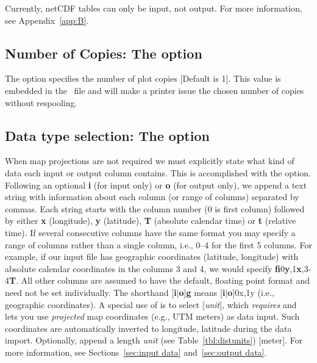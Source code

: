 Currently, netCDF tables can only be input, not output.
For more information, see Appendix~\ref{app:B}.

\subsection{Number of Copies: The  option}

The  option specifies the number of plot copies [Default is 1].  This
value is embedded in the \PS\ file and will make a printer issue the chosen
number of copies without respooling.

\subsection{Data type selection: The  option}
\label{sec:fg_option}

When map projections are not required we must explicitly state
what kind of data each input or output column contains.  This is accomplished with
the  option.  Following an optional \textbf{i} (for input only) or \textbf{o} (for output
only), we append a text string with information about each column (or range of columns) separated by commas.
Each string starts with the column number (0 is first column) followed by either
\textbf{x} (longitude), \textbf{y} (latitude), \textbf{T} (absolute calendar time) or \textbf{t} (relative time).  If
several consecutive columns have the same format you may specify a range of columns
rather than a single column, i.e., 0--4 for the first 5 columns.  For example, if our
input file has geographic coordinates (latitude, longitude) with absolute calendar
coordinates in the columns 3 and 4, we would specify \textbf{fi}0\textbf{y},1\textbf{x},3-4\textbf{T}.  All other columns
are assumed to have the default, floating point format and need not be set individually.
The shorthand [\textbf{i}$|$\textbf{o}]\textbf{g} means [\textbf{i}$|$\textbf{o}]0x,1y (i.e., geographic coordinates).
A special use of  is to select [{\it unit}], which \emph{requires}  and lets you
use \emph{projected} map coordinates (e.g., UTM meters) as data input.  Such coordinates are automatically inverted to longitude, latitude
during the data import.  Optionally, append a length {\it unit} (see Table~\ref{tbl:distunits}) [meter].
For more information, see Sections~\ref{sec:input data} and~\ref{sec:output data}.

